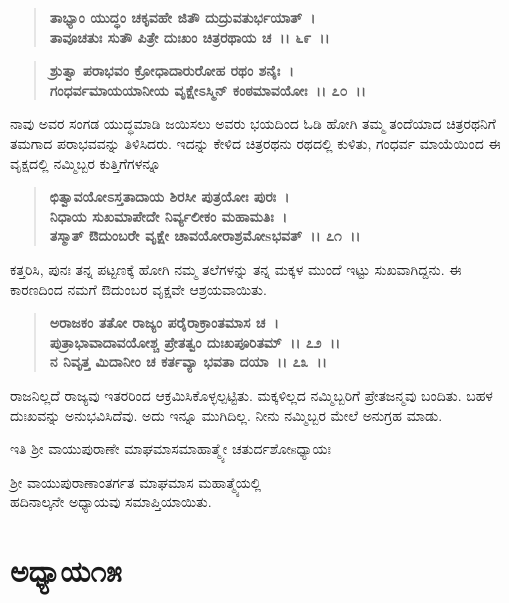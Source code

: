 \begin{verse}
\textbf{ತಾಭ್ಯಾಂ ಯುದ್ಧಂ ಚಕೃವಹೇ ಜಿತೌ ದುದ್ರುವತುರ್ಭಯಾತ್~।}\\\textbf{ತಾವೂಚತುಃ ಸುತೌ ಪಿತ್ರೇ ದುಃಖಂ ಚಿತ್ರರಥಾಯ ಚ~।। ೬೯~।।} 
\end{verse}

\begin{verse}
\textbf{ಶ್ರುತ್ವಾ ಪರಾಭವಂ ಕ್ರೋಧಾದಾರುರೋಹ ರಥಂ ಶನೈಃ~।}\\\textbf{ಗಂಧರ್ವಮಾಯಯಾನೀಯ ವೃಕ್ಷೇಽಸ್ಮಿನ್ ಕಂಠಮಾವಯೋಃ~।। ೭೦~।।}
\end{verse}

ನಾವು ಅವರ ಸಂಗಡ ಯುದ್ಧಮಾಡಿ ಜಯಿಸಲು ಅವರು ಭಯದಿಂದ ಓಡಿ ಹೋಗಿ ತಮ್ಮ ತಂದೆಯಾದ ಚಿತ್ರರಥನಿಗೆ ತಮಗಾದ ಪರಾಭವವನ್ನು ತಿಳಿಸಿದರು. ಇದನ್ನು ಕೇಳಿದ ಚಿತ್ರರಥನು ರಥದಲ್ಲಿ ಕುಳಿತು, ಗಂಧರ್ವ ಮಾಯೆಯಿಂದ ಈ ವೃಕ್ಷದಲ್ಲಿ ನಮ್ಮಿಬ್ಬರ ಕುತ್ತಿಗೆಗಳನ್ನೂ

\begin{verse}
\textbf{ಛಿತ್ವಾವಯೋಽಸ್ತತಾದಾಯ ಶಿರಸೀ ಪುತ್ರಯೋಃ ಪುರಃ~।}\\\textbf{ನಿಧಾಯ ಸುಖಮಾಪೇದೇ ನಿರ್ವ್ಯಲೀಕಂ ಮಹಾಮತಿಃ~।}\\\textbf{ತಸ್ಮಾತ್‌ ಔದುಂಬರೇ ವೃಕ್ಷೇ ಚಾವಯೋರಾಶ್ರಮೋsಭವತ್~।। ೭೧~।।}
\end{verse}

ಕತ್ತರಿಸಿ, ಪುನಃ ತನ್ನ ಪಟ್ಟಣಕ್ಕೆ ಹೋಗಿ ನಮ್ಮ ತಲೆಗಳನ್ನು ತನ್ನ ಮಕ್ಕಳ ಮುಂದೆ ಇಟ್ಟು ಸುಖವಾಗಿದ್ದನು. ಈ ಕಾರಣದಿಂದ ನಮಗೆ ಔದುಂಬರ ವೃಕ್ಷವೇ ಆಶ್ರಯವಾಯಿತು.

\begin{verse}
\textbf{ಅರಾಜಕಂ ತತೋ ರಾಜ್ಯಂ ಪರೈರಾಕ್ರಾಂತಮಾಸ ಚ~।}\\\textbf{ಪುತ್ರಾಭಾವಾದಾವಯೋಶ್ಚ ಪ್ರೇತತ್ವಂ ದುಃಖಪೂರಿತಮ್~।। ೭೨~।।}\\\textbf{ನ ನಿವೃತ್ತ ಮಿದಾನೀಂ ಚ ಕರ್ತವ್ಯಾ ಭವತಾ ದಯಾ~।। ೭೩~।।}
\end{verse}

ರಾಜನಿಲ್ಲದೆ ರಾಜ್ಯವು ಇತರರಿಂದ ಆಕ್ರಮಿಸಿಕೊಳ್ಳಲ್ಪಟ್ಟಿತು. ಮಕ್ಕಳಿಲ್ಲದ ನಮ್ಮಿಬ್ಬರಿಗೆ ಪ್ರೇತಜನ್ಮವು ಬಂದಿತು. ಬಹಳ ದುಃಖವನ್ನು ಅನುಭವಿಸಿದೆವು. ಅದು ಇನ್ನೂ ಮುಗಿದಿಲ್ಲ. ನೀನು ನಮ್ಮಿಬ್ಬರ ಮೇಲೆ ಅನುಗ್ರಹ ಮಾಡು.

\begin{center}
ಇತಿ ಶ‍್ರೀ ವಾಯುಪುರಾಣೇ ಮಾಘಮಾಸಮಾಹಾತ್ಮ್ಯೇ ಚತುರ್ದಶೋsಧ್ಯಾಯಃ 
\end{center}

\begin{center}
ಶ‍್ರೀ ವಾಯುಪುರಾಣಾಂತರ್ಗತ ಮಾಘಮಾಸ ಮಹಾತ್ಮ್ಯೆಯಲ್ಲಿ \\ ಹದಿನಾಲ್ಕನೇ ಅಧ್ಯಾಯವು ಸಮಾಪ್ತಿಯಾಯಿತು.
\end{center}

\newpage

\section*{ಅಧ್ಯಾಯ೧೫}

